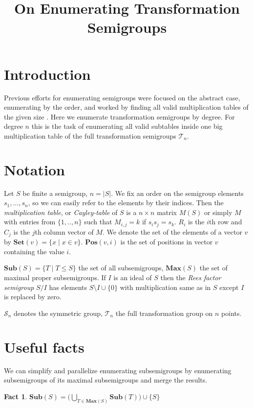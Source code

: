 \documentclass{amsart}
\newcommand{\cT}{{\mathcal T}}
\newcommand{\cS}{{\mathcal S}}
\newcommand{\Sub}{\mathbf{Sub}}
\newcommand{\Set}{\mathbf{Set}}
\newcommand{\Pos}{\mathbf{Pos}}
\newcommand{\Max}{\mathbf{Max}}
\theoremstyle{plain}
\newtheorem{fact}[theorem]{Fact}
\theoremstyle{definition}
\begin{document}
\title{On Enumerating Transformation Semigroups}
\maketitle

\tableofcontents
\section{Introduction}
Previous efforts for enumerating semigroups were focused on the abstract case, enumerating by the order, and worked by finding all valid multiplication tables of the given size \cite{monoidenum2009}.
Here we enumerate transformation semigroups by degree.
For degree $n$ this is the task of enumerating all valid subtables inside one big multiplication table of the  full transformation semigroups $\cT_n$.

\section{Notation}
Let $S$ be finite a semigroup, $n=|S|$.
We fix an order on the semigroup elements $s_1,\ldots, s_n$, so we can easily refer to the elements by their indices. 
Then the  \emph{multiplication table}, or \emph{Cayley-table} of $S$ is a $n\times n$ matrix $M(S)$ or simply $M$ with entries from $\{1,..,n\}$ such that $M_{i,j}=k$ if $s_is_j=s_k$.
$R_i$ is the $i$th row and $C_j$ is the $j$th column vector of $M$.
We denote the set of the elements of a vector $v$ by $\Set(v)=\{x\mid x\in v\}$.
$\Pos(v,i)$ is the set of positions in vector $v$ containing the value $i$.

$\Sub(S)=\big\{T\mid T\leq S \big\}$ the set of all subsemigroups, $\Max(S)$ the set of maximal proper subsemigroups.
If $I$ is an ideal of $S$ then the \emph{Rees factor semigroup} $S/I$ has elements $S\setminus I\cup\{0\}$ with multiplication same as in $S$ except $I$ is replaced by zero.

$\cS_n$ denotes the symmetric group, $\cT_n$ the full transformation group on $n$ points.
\section{Useful facts}
We can simplify and parallelize enumerating subsemigroups by enumerating subsemigroups of its maximal subsemigroups and merge the results.
\begin{fact}
$\Sub(S)=\big( \bigcup_{T\in \Max(S)}\Sub(T)\big)\cup \{S\}$
\end{fact}
\end{document}
